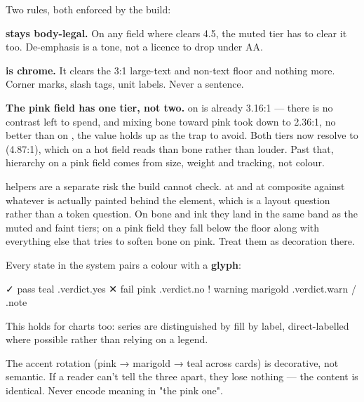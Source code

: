 \documentclass[fontpath=fonts/,logopath=logo/]{riposte-doc}
\begin{document}
Two rules, both enforced by the build:

\begin{ripbullets}
\item \textbf{ stays body-legal.} On any field where  clears 4.5, the muted tier has to clear it too. De-emphasis is a tone, not a licence to drop under AA.
\item \textbf{ is chrome.} It clears the 3:1 large-text and non-text floor and nothing more. Corner marks, slash tags, unit labels. Never a sentence.
\end{ripbullets}

\textbf{The pink field has one tier, not two.}  on  is already 3.16:1 — there is no contrast left to spend, and mixing bone toward pink took  down to 2.36:1, no better than  on , the value  holds up as the trap to avoid. Both tiers now resolve to  (4.87:1), which on a hot field reads  than bone rather than louder. Past that, hierarchy on a pink field comes from size, weight and tracking, not colour.

 helpers are a separate risk the build cannot check.  at  and  at  composite against whatever is actually painted behind the element, which is a layout question rather than a token question. On bone and ink they land in the same band as the muted and faint tiers; on a pink field they fall below the floor along with everything else that tries to soften bone on pink. Treat them as decoration there.



Every state in the system pairs a colour with a \textbf{glyph}:

\ripcodeopen
{}
\begin{ripcodeblock}
✓  pass      teal      .verdict.yes
✕  fail      pink      .verdict.no
!  warning   marigold  .verdict.warn / .note
\end{ripcodeblock}
\ripcodesizereset\ripcodeclose

This holds for charts too: series are distinguished by fill  by label, direct-labelled where possible rather than relying on a legend.

The accent rotation (pink → marigold → teal across cards) is decorative, not semantic. If a reader can't tell the three apart, they lose nothing — the content is identical. Never encode meaning in "the pink one".
\end{document}
